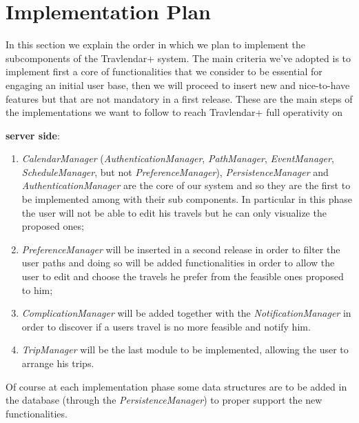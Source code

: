 \section{Implementation Plan}
In this section we explain the order in which we plan to implement the subcomponents of the Travlendar+ system.
The main criteria we've adopted is to implement first a core of functionalities that we consider to be essential for engaging an initial user base, then we will proceed to insert new and nice-to-have features but that are not mandatory in a first release.
These are the main steps of the implementations we want to follow to reach Travlendar+ full operativity on\begin{large}
\textbf{server side}:
\end{large}
\begin{enumerate}
\item \textit{CalendarManager} (\textit{AuthenticationManager}, \textit{PathManager}, \textit{EventManager}, \textit{ScheduleManager}, but not \textit{PreferenceManager}), \textit{PersistenceManager} and \textit{AuthenticationManager} are the core of our system and so they are the first to be implemented among with their sub components. In particular in this phase the user will not be able to edit his travels but he can only visualize the proposed ones;
\item \textit{PreferenceManager} will be inserted in a second release in order to filter the user paths and doing so will be added functionalities in order to allow the user to edit and choose the travels he prefer from the feasible ones proposed to him;
\item \textit{ComplicationManager} will be added together with the \textit{NotificationManager} in order to discover if a users travel is no more feasible and notify him.
\item \textit{TripManager} will be the last module to be implemented, allowing the user to arrange his trips.
\end{enumerate}
Of course at each implementation phase some data structures are to be added in the database (through the \textit{PersistenceManager}) to proper support the new functionalities.

